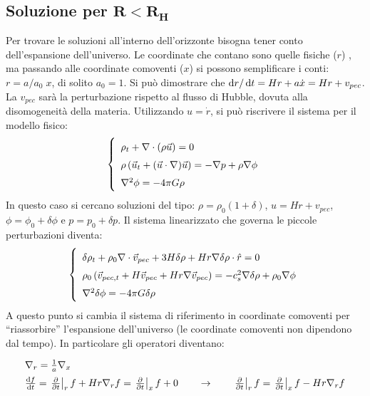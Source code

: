 \subsection{Soluzione per $\mathbf{R < R_H}$}\label{ch6:chilovoleva}
Per trovare le soluzioni all'interno dell'orizzonte bisogna tener conto dell'espansione dell'universo. Le coordinate che contano sono quelle fisiche ($r$) , ma passando alle coordinate comoventi ($x$) si possono semplificare i conti: $r=a/a_0 \; x$, di solito $a_0=1$. Si può dimostrare che $\operatorname{d}\!{r}/\operatorname{d}\!{t} = Hr + a\dot{x} = Hr+ v_{pec}$. La $v_{pec}$ sarà la perturbazione rispetto al flusso di Hubble, dovuta alla disomogeneità della materia. Utilizzando $u=\dot{r}$, si può riscrivere il sistema per il modello fisico:
\begin{equation}\left\{
    \def\arraystretch{1.5}
    \begin{array}{l}
        \rho_t + \nabla\cdot (\rho \vec{u}) =0 \\
        \rho \left ( \vec{u}_t + (\vec{u} \cdot \nabla) \vec{u} \right) = -\nabla p +\rho \nabla \phi \\
        \nabla^2 \phi = - 4 \pi G \rho
    \end{array}\right.
\end{equation}
In questo caso si cercano soluzioni del tipo: $\rho = \rho_0 (1+\delta)$, $u=Hr+v_{pec}$, $\phi=\phi_0+\delta\phi$ e $p=p_0+\delta p$. Il sistema linearizzato che governa le piccole perturbazioni diventa:
\begin{equation}\left\{
    \def\arraystretch{1.5}
    \begin{array}{l}
        \delta\rho_t + \rho_0 \nabla\cdot\vec{v}_{pec} + 3H \delta\rho + Hr \nabla \delta\rho \cdot \hat{r} =0 \\
        \rho_0 \left ( \vec{v}_{pec, t} + H \vec{v}_{pec}+ Hr\nabla\vec{v}_{pec}\right ) = -c_s^2 \nabla\delta\rho +\rho_0\nabla\phi \\
        \nabla^2 \delta \phi = -4\pi G \delta\rho
    \end{array}\right.
\end{equation}
A questo punto si cambia il sistema di riferimento in coordinate comoventi per ``riassorbire'' l'espansione dell'universo (le coordinate comoventi non dipendono dal tempo). In particolare gli operatori diventano:
\begin{equation*}
    \def\arraystretch{1.5}
    \begin{array}{l}
        \nabla_r = \frac{1}{a}\nabla_x \\
        \frac{\d{f}}{\d{t}} = \left. \frac{\partial}{\partial t} \right|_r f + Hr \nabla_r f = \left. \frac{\partial}{\partial t} \right|_x f + 0 \qquad \rightarrow \qquad \left. \frac{\partial}{\partial t} \right|_r f = \left. \frac{\partial}{\partial t} \right|_x f - Hr \nabla_r f  
    \end{array}
\end{equation*}
